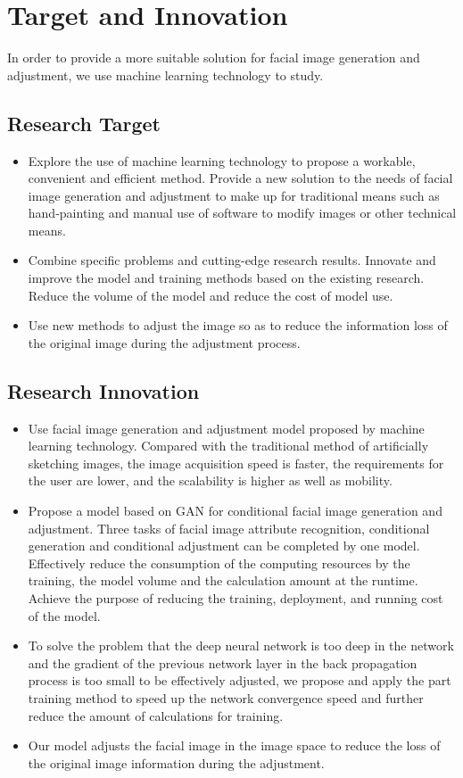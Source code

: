 \section{Target and Innovation}

In order to provide a more suitable solution for facial image generation and adjustment,
    we use machine learning technology to study.

\subsection{Research Target}
\begin{itemize}
\item Explore the use of machine learning technology to propose a workable, convenient and efficient method.
    Provide a new solution to the needs of facial image generation and adjustment to make up for traditional means such as hand-painting and manual use of software to modify images or other technical means.
\item Combine specific problems and cutting-edge research results.
    Innovate and improve the model and training methods based on the existing research.
    Reduce the volume of the model and reduce the cost of model use.
\item Use new methods to adjust the image so as to reduce the information loss of the original image during the adjustment process.
\end{itemize}
\subsection{Research Innovation}
\begin{itemize}
\item Use facial image generation and adjustment model proposed by machine learning technology.
    Compared with the traditional method of artificially sketching images, the image acquisition speed is faster, the requirements for the user are lower,
    and the scalability is higher as well as mobility.
\item Propose a model based on GAN for conditional facial image generation and adjustment.
    Three tasks of facial image attribute recognition,
    conditional generation and conditional adjustment can be completed by one model.
    Effectively reduce the consumption of the computing resources by the training,
    the model volume and the calculation amount at the runtime.
    Achieve the purpose of reducing the training, deployment, and running cost of the model.
\item To solve the problem that the deep neural network is too deep in the network and the gradient of the previous network layer in the back propagation process is too small to be effectively adjusted,
    we propose and apply the part training method to speed up the network convergence speed and further reduce the amount of calculations for training.

\item Our model adjusts the facial image in the image space to reduce the loss of the original image information during the adjustment.
\end{itemize}